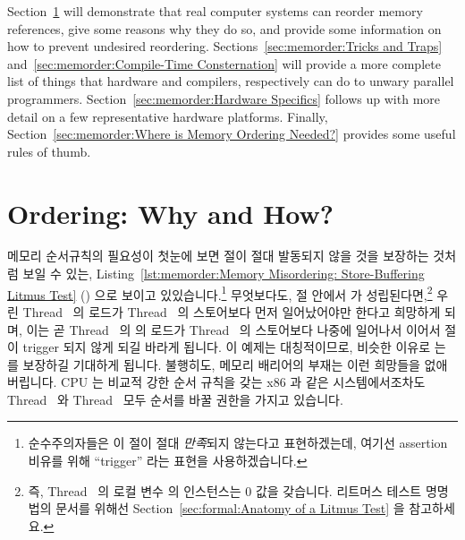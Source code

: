 Section~\ref{sec:memorder:Ordering: Why and How?}
will demonstrate that real computer systems can reorder memory references,
give some reasons why they do so, and provide some information on how
to prevent undesired reordering.
Sections~\ref{sec:memorder:Tricks and Traps}
and~\ref{sec:memorder:Compile-Time Consternation}
will provide a more complete list of things that hardware and compilers,
respectively can do to unwary parallel programmers.
Section~\ref{sec:memorder:Hardware Specifics}
follows up with more detail on a few representative hardware platforms.
Finally, Section~\ref{sec:memorder:Where is Memory Ordering Needed?}
provides some useful rules of thumb.
\fi

\section{Ordering: Why and How?}
\label{sec:memorder:Ordering: Why and How?}

메모리 순서규칙의 필요성이 첫눈에 보면  절이 절대 발동되지 않을 것을
보장하는 것처럼 보일 수 있는,
Listing~\ref{lst:memorder:Memory Misordering: Store-Buffering Litmus Test}
()
으로 보이고 있있습니다.\footnote{
	순수주의자들은 이  절이 절대 \emph{만족}되지 않는다고
	표현하겠는데, 여기선 assertion 비유를 위해 ``trigger'' 라는 표현을
	사용하겠습니다.}
무엇보다도,  절 안에서  가 성립된다면,\footnote{
	즉, Thread~ 의 로컬 변수  의 인스턴스는 0 값을
	갖습니다.
	리트머스 테스트 명명법의 문서를 위해선
	Section~\ref{sec:formal:Anatomy of a Litmus Test} 을 참고하세요.}
우린 Thread~ 의  로드가 Thread~ 의  스토어보다
먼저 일어났어야만 한다고 희망하게 되며, 이는 곧 Thread~ 의  의
로드가 Thread~ 의  스토어보다 나중에 일어나서 
이어서  절이 trigger 되지 않게 되길 바라게 됩니다.
이 예제는 대칭적이므로, 비슷한 이유로  는  를
보장하길 기대하게 됩니다.
불행히도, 메모리 배리어의 부재는 이런 희망들을 없애버립니다.
CPU 는 비교적 강한 순서 규칙을 갖는 x86 과 같은 시스템에서조차도
Thread~ 와 Thread~ 모두 순서를 바꿀 권한을 가지고 있습니다.
\iffalse

